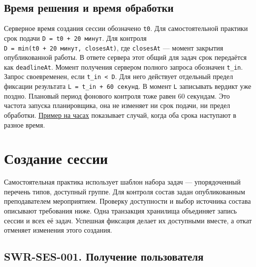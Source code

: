 \documentclass[12pt,a4paper]{article}
\begin{document}
\subsection{Время решения и время обработки}\label{ux432ux440ux435ux43cux44f-ux440ux435ux448ux435ux43dux438ux44f-ux438-ux432ux440ux435ux43cux44f-ux43eux431ux440ux430ux431ux43eux442ux43aux438}

\hypertarget{время-решения-и-время-обработки}{}

Серверное время создания сессии обозначено \texttt{t0}. Для самостоятельной практики срок подачи \texttt{D\ =\ t0\ +\ 20\ минут}. Для контроля \texttt{D\ =\ min(t0\ +\ 20\ минут,\ closesAt)}, где \texttt{closesAt} --- момент закрытия опубликованной работы. В ответе сервера этот общий для задач срок передаётся как \texttt{deadlineAt}. Момент получения сервером полного запроса обозначен \texttt{t\_in}. Запрос своевременен, если \texttt{t\_in\ \textless{}\ D}. Для него действует отдельный предел фиксации результата \texttt{L =\allowbreak{} t\_\allowbreak{}in + 60 секунд}. В момент \texttt{L} записывать вердикт уже поздно. Плановый период фонового контроля тоже равен 60 секундам. Это частота запуска планировщика, она не изменяет ни срок подачи, ни предел обработки. {\hyperlink{согласование-параллельных-событий}{Пример на часах}} показывает случай, когда оба срока наступают в разное время.

\section{Создание сессии}\label{2-ux441ux43eux437ux434ux430ux43dux438ux435-ux441ux435ux441ux441ux438ux438}

\hypertarget{2-создание-сессии}{}

Самостоятельная практика использует шаблон набора задач --- упорядоченный перечень типов, доступный группе. Для контроля состав задан опубликованным преподавателем мероприятием. Проверку доступности и выбор источника состава описывают требования ниже. Одна транзакция хранилища объединяет запись сессии и всех её задач. Успешная фиксация делает их доступными вместе, а откат отменяет изменения этого создания.

\subsection{SWR-SES-001. Получение пользователя}\label{swr-ses-001-ux43fux43eux43bux443ux447ux435ux43dux438ux435-ux43fux43eux43bux44cux437ux43eux432ux430ux442ux435ux43bux44f}
\end{document}
